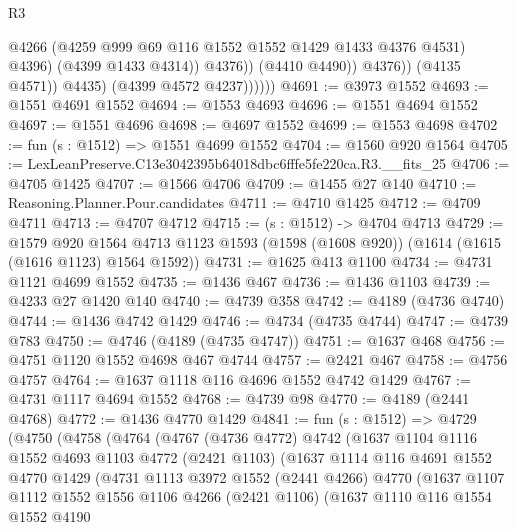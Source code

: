 \begin{lexlean}{R3}
\begin{coremodule}
                                @4266
                                (@4259 @999 @69 @116 @1552 @1552 @1429 @1433 @4376 @4531)
                                @4396)
                              (@4399 @1433 @4314))
                            @4376))
                        (@4410 @4490))
                      @4376))
                  (@4135 @4571))
                @4435)
              (@4399 @4572 @4237))))))
@4691 := @3973 @1552
@4693 := @1551 @4691 @1552
@4694 := @1553 @4693
@4696 := @1551 @4694 @1552
@4697 := @1551 @4696
@4698 := @4697 @1552
@4699 := @1553 @4698
@4702 := fun (s : @1512) => @1551 @4699 @1552
@4704 := @1560 @920 @1564
@4705 := LexLeanPreserve.C13e3042395b64018dbc6fffe5fe220ca.R3.__fits_25
@4706 := @4705 @1425
@4707 := @1566 @4706
@4709 := @1455 @27 @140
@4710 := Reasoning.Planner.Pour.candidates
@4711 := @4710 @1425
@4712 := @4709 @4711
@4713 := @4707 @4712
@4715 := (s : @1512) -> @4704 @4713
@4729 := @1579
    @920
    @1564
    @4713
    @1123
    @1593
    (@1598 (@1608 @920))
    (@1614 (@1615 (@1616 @1123) @1564 @1592))
@4731 := @1625 @413 @1100
@4734 := @4731 @1121 @4699 @1552
@4735 := @1436 @467
@4736 := @1436 @1103
@4739 := @4233 @27 @1420 @140
@4740 := @4739 @358
@4742 := @4189 (@4736 @4740)
@4744 := @1436 @4742 @1429
@4746 := @4734 (@4735 @4744)
@4747 := @4739 @783
@4750 := @4746 (@4189 (@4735 @4747))
@4751 := @1637 @468
@4756 := @4751 @1120 @1552 @4698 @467 @4744
@4757 := @2421 @467
@4758 := @4756 @4757
@4764 := @1637 @1118 @116 @4696 @1552 @4742 @1429
@4767 := @4731 @1117 @4694 @1552
@4768 := @4739 @98
@4770 := @4189 (@2441 @4768)
@4772 := @1436 @4770 @1429
@4841 := fun (s : @1512) =>
  @4729
    (@4750
      (@4758
        (@4764
          (@4767
            (@4736 @4772)
            @4742
            (@1637
              @1104
              @1116
              @1552
              @4693
              @1103
              @4772
              (@2421 @1103)
              (@1637
                @1114
                @116
                @4691
                @1552
                @4770
                @1429
                (@4731
                  @1113
                  @3972
                  @1552
                  (@2441 @4266)
                  @4770
                  (@1637
                    @1107
                    @1112
                    @1552
                    @1556
                    @1106
                    @4266
                    (@2421 @1106)
                    (@1637
                      @1110
                      @116
                      @1554
                      @1552
                      @4190

\end{coremodule}
\end{lexlean}
